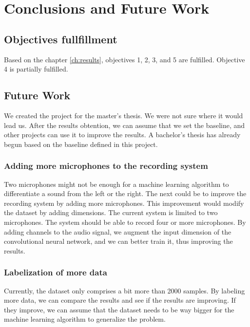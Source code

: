 \chapter{Conclusions and Future Work}
\label{ch:conclusions}

\section{Objectives fullfillment}

Based on the chapter \ref{ch:results}, objectives 1, 2, 3, and 5 are fulfilled. Objective 4 is partially fulfilled. 

\section{Future Work}

We created the project for the master's thesis. We were not sure where it would lead us. After the results obtention, we can assume that we set the baseline, and other projects can use it to improve the results. A bachelor's thesis has already begun based on the baseline defined in this project. 

\subsection{Adding more microphones to the recording system}


Two microphones might not be enough for a machine learning algorithm to differentiate a sound from the left or the right. The next could be to improve the recording system by adding more microphones. This improvement would modify the dataset by adding dimensions. The current system is limited to two microphones. The system should be able to record four or more microphones. By adding channels to the audio signal, we augment the input dimension of the convolutional neural network, and we can better train it, thus improving the results.

\subsection{Labelization of more data}

Currently, the dataset only comprises a bit more than 2000 samples. By labeling more data, we can compare the results and see if the results are improving. If they improve, we can assume that the dataset needs to be way bigger for the machine learning algorithm to generalize the problem.

